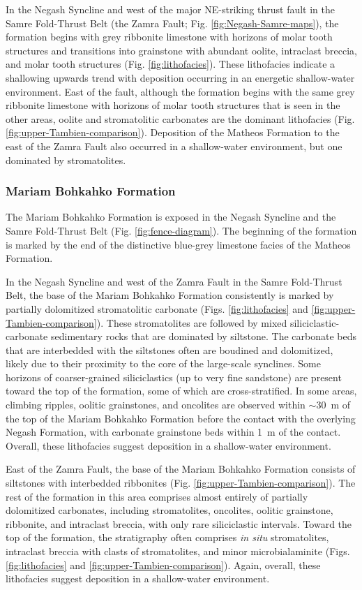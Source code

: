 In the Negash Syncline and west of the major NE-striking thrust fault in the Samre Fold-Thrust Belt (the Zamra Fault; Fig. \ref{fig:Negash-Samre-maps}), the formation begins with grey ribbonite limestone with horizons of molar tooth structures and transitions into grainstone with abundant oolite, intraclast breccia, and molar tooth structures (Fig. \ref{fig:lithofacies}). These lithofacies indicate a shallowing upwards trend with deposition occurring in an energetic shallow-water environment. East of the fault, although the formation begins with the same grey ribbonite limestone with horizons of molar tooth structures that is seen in the other areas, oolite and stromatolitic carbonates are the dominant lithofacies (Fig. \ref{fig:upper-Tambien-comparison}). Deposition of the Matheos Formation to the east of the Zamra Fault also occurred in a shallow-water environment, but one dominated by stromatolites.

\subsubsection{Mariam Bohkahko Formation}

The Mariam Bohkahko Formation is exposed in the Negash Syncline and the Samre Fold-Thrust Belt (Fig. \ref{fig:fence-diagram}). The beginning of the formation is marked by the end of the distinctive blue-grey limestone facies of the Matheos Formation.

In the Negash Syncline and west of the Zamra Fault in the Samre Fold-Thrust Belt, the base of the Mariam Bohkahko Formation consistently is marked by partially dolomitized stromatolitic carbonate (Figs. \ref{fig:lithofacies} and \ref{fig:upper-Tambien-comparison}). These stromatolites are followed by mixed siliciclastic-carbonate sedimentary rocks that are dominated by siltstone. The carbonate beds that are interbedded with the siltstones often are boudined and dolomitized, likely due to their proximity to the core of the large-scale synclines. Some horizons of coarser-grained siliciclastics (up to very fine sandstone) are present toward the top of the formation, some of which are cross-stratified. In some areas, climbing ripples, oolitic grainstones, and oncolites are observed within $\sim$30~m of the top of the Mariam Bohkahko Formation before the contact with the overlying Negash Formation, with carbonate grainstone beds within 1~m of the contact. Overall, these lithofacies suggest deposition in a shallow-water environment.

East of the Zamra Fault, the base of the Mariam Bohkahko Formation consists of siltstones with interbedded ribbonites (Fig. \ref{fig:upper-Tambien-comparison}). The rest of the formation in this area comprises almost entirely of partially dolomitized carbonates, including stromatolites, oncolites, oolitic grainstone, ribbonite, and intraclast breccia, with only rare siliciclastic intervals. Toward the top of the formation, the stratigraphy often comprises \textit{in situ} stromatolites, intraclast breccia with clasts of stromatolites, and minor microbialaminite (Figs. \ref{fig:lithofacies} and \ref{fig:upper-Tambien-comparison}). Again, overall, these lithofacies suggest deposition in a shallow-water environment.

